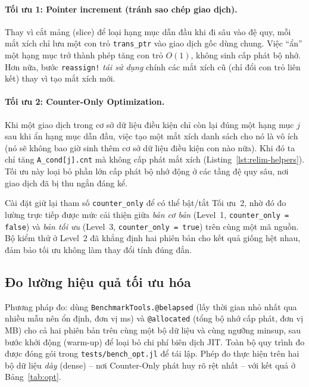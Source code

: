 \documentclass[12pt,a4paper]{report}
\begin{document}
\paragraph{Tối ưu 1: Pointer increment (tránh sao chép giao dịch).}
Thay vì cắt mảng (slice) để loại hạng mục dẫn đầu khi đi sâu vào đệ quy, mỗi mắt
xích chỉ lưu một con trỏ \texttt{trans\_ptr} vào giao dịch gốc dùng chung. Việc
``ẩn'' một hạng mục trở thành phép tăng con trỏ $O(1)$, không sinh cấp phát bộ
nhớ. Hơn nữa, bước \texttt{reassign!} \emph{tái sử dụng} chính các mắt xích cũ
(chỉ đổi con trỏ liên kết) thay vì tạo mắt xích mới.

\paragraph{Tối ưu 2: Counter-Only Optimization.}
Khi một giao dịch trong cơ sở dữ liệu điều kiện chỉ còn lại đúng một hạng mục
$j$ sau khi ẩn hạng mục dẫn đầu, việc tạo một mắt xích danh sách cho nó là vô
ích (nó sẽ không bao giờ sinh thêm cơ sở dữ liệu điều kiện con nào nữa). Khi đó
ta chỉ tăng \texttt{A\_cond[j].cnt} mà không cấp phát mắt xích
(Listing~\ref{lst:relim-helpers}). Tối ưu này loại bỏ phần lớn cấp phát bộ nhớ
động ở các tầng đệ quy sâu, nơi giao dịch đã bị thu ngắn đáng kể.

Cài đặt giữ lại tham số \texttt{counter\_only} để có thể bật/tắt Tối ưu~2, nhờ
đó đo lường trực tiếp được mức cải thiện giữa \emph{bản cơ bản} (Level~1,
\texttt{counter\_only = false}) và \emph{bản tối ưu} (Level~3,
\texttt{counter\_only = true}) trên cùng một mã nguồn. Bộ kiểm thử ở Level~2 đã
khẳng định hai phiên bản cho kết quả giống hệt nhau, đảm bảo tối ưu không làm
thay đổi tính đúng đắn.

\subsection{Đo lường hiệu quả tối ưu hóa}

Phương pháp đo: dùng \texttt{BenchmarkTools.@belapsed} (lấy thời gian nhỏ nhất
qua nhiều mẫu nên ổn định, đơn vị ms) và \texttt{@allocated} (tổng bộ nhớ cấp
phát, đơn vị MB) cho cả hai phiên bản trên cùng một bộ dữ liệu và cùng ngưỡng
minsup, sau bước khởi động (warm-up) để loại bỏ chi phí biên dịch JIT. Toàn bộ
quy trình đo được đóng gói trong \texttt{tests/bench\_opt.jl} để tái lập. Phép
đo thực hiện trên hai bộ dữ liệu \emph{dày} (dense) -- nơi Counter-Only phát huy
rõ rệt nhất -- với kết quả ở Bảng~\ref{tab:opt}.
\end{document}
